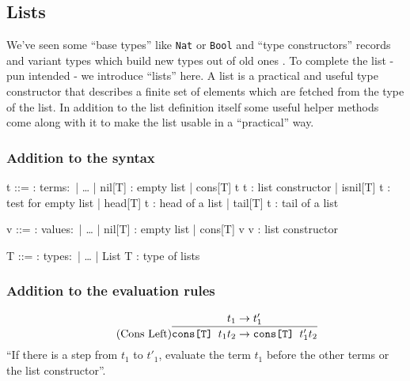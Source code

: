 \subsection{Lists}

We've seen some ``base types'' like \texttt{Nat} or \texttt{Bool}
and ``type constructors'' records and variant types which build
new types out of old ones \cite{pierce2002ProgLang}.
To complete the list - pun intended - we introduce
``lists'' here. A list is a practical and useful type constructor
that describes a finite set of elements which are fetched from the
type of the list.
In addition to the list definition itself some useful helper
methods come along with it to make the list usable in a ``practical''
way.

\subsubsection{Addition to the syntax \cite{pierce2002ProgLang}}
\begin{bnfgrammar}
    t ::= : terms$\colon$
    | \dots
    | nil[T] : empty list
    | cons[T] t t : list constructor
    | isnil[T] t : test for empty list
    | head[T] t : head of a list
    | tail[T] t : tail of a list
\end{bnfgrammar}\leavevmode\newline

\begin{bnfgrammar}
    v ::= : values$\colon$
    | \dots
    | nil[T] : empty list
    | cons[T] v v : list constructor
\end{bnfgrammar}\leavevmode\newline

\begin{bnfgrammar}
    T ::= : types$\colon$
    | \dots
    | List T : type of lists
\end{bnfgrammar}\leavevmode\newline

\subsubsection{Addition to the evaluation rules \cite{pierce2002ProgLang}}
\begin{equation*}
    \tag{Cons Left}
    \infer{
        \texttt{cons[T] } t_1 t_2 \rightarrow \texttt{cons[T] } t'_1 t_2
    }{
        t_1 \rightarrow t'_1
    }
\end{equation*}
``If there is a step from $t_1$ to $t'_1$, evaluate the term $t_1$
before the other terms or the list constructor''.

